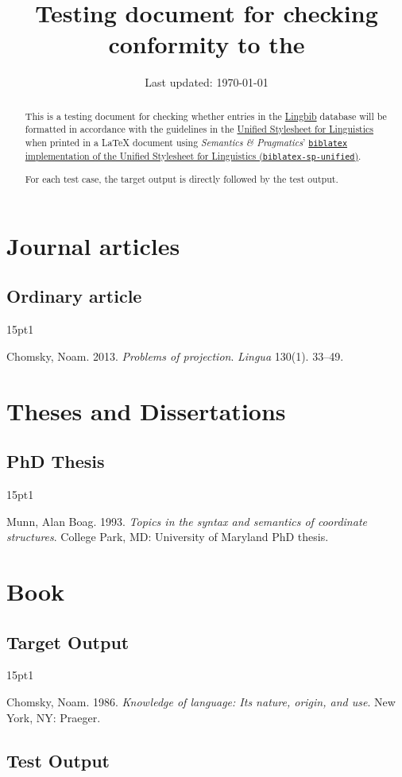 \documentclass{article}
\title{Testing document for checking conformity to the \UnifiedStyleSheet}
\author{\Lingbib}
\date{Last updated: \today}
\newcommand*{\Lingbib}{\href{http://lingbib.org/}{Lingbib}}
\newcommand*{\SP}{\emph{Semantics \& Pragmatics}}
\newcommand*{\UnifiedStyleSheet}{\href{http://celxj.org/downloads/UnifiedStyleSheet.pdf}{Unified Stylesheet for Linguistics}}
\newcommand*{\Package}[1]{\texttt{#1}}
\newcommand*{\bibentrytest}[2]{
	\begin{hangparas}{15pt}{1}
	#1
	\end{hangparas}
	
	\nocite{#2}
	\printbibliography[heading=none]
}
\begin{document}
\maketitle

\begin{abstract}
This is a testing document for checking whether entries in the \Lingbib{} database will be formatted in accordance with the guidelines in the \UnifiedStyleSheet{} when printed in a \LaTeX{} document using  \SP' \href{https://github.com/semprag/biblatex-sp-unified/}{\Package{biblatex} implementation of the Unified Stylesheet for Linguistics (\Package{biblatex-sp-unified})}.

For each test case, the target output is directly followed by the test output.
\end{abstract}



\section{Journal articles}

\subsection{Ordinary article}

\bibentrytest{
	Chomsky, Noam. 2013. \textit{Problems of projection}. \textit{Lingua} 130(1). 33--49.
	}{
	chomsky2013:projection
}



\section{Theses and Dissertations}

\subsection{PhD Thesis}

\bibentrytest{
	Munn, Alan Boag. 1993. \textit{Topics in the syntax and semantics of coordinate structures}. College Park, MD: University of Maryland PhD thesis.
}{
munn1993:coordinate
}



\section{Book}

\subsection{Target Output}

\begin{hangparas}{15pt}{1}
	
Chomsky, Noam. 1986. \textit{Knowledge of language: Its nature, origin, and use}. New York, NY: Praeger.

\end{hangparas}

\subsection{Test Output}

\nocite{chomsky1986:knowledge}

\printbibliography[
heading=none
]
\end{document}
